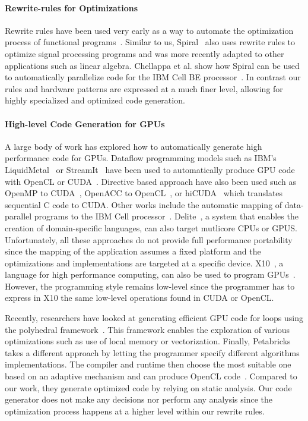\paragraph{Rewrite-rules for Optimizations}
Rewrite rules have been used very early as a way to automate the optimization process of functional programs~\cite{jones01playing}.
Similar to us, Spiral~\cite{pueschel05spiral,Spampinato13LGen} also uses rewrite rules to optimize signal processing programs and was more recently adapted to other applications such as linear algebra.
Chellappa et al. show how Spiral can be used to automatically parallelize code for the IBM Cell BE processor~\cite{Chellappa09computer}.
In contrast our rules and hardware patterns are expressed at a much finer level, allowing for highly specialized and optimized code generation.

\paragraph{High-level Code Generation for GPUs} 
A large body of work has explored how to automatically generate high performance code for GPUs.
Dataflow programming models such as IBM's LiquidMetal~\cite{dubach12compiling} or StreamIt~\cite{thies02streamit} have been used to automatically produce GPU code with OpenCL or CUDA~\cite{hormati11sponge,huynh12scalable,udupa09software}.
Directive based approach have also been used such as OpenMP to CUDA~\cite{lee09openmp}, OpenACC to OpenCL~\cite{reyes12openaccgpu}, or hiCUDA~\cite{han11hicuda} which translates sequential C code to CUDA.
Other works include the automatic mapping of data-parallel programs to the IBM Cell processor~\cite{Wang09automatic}.
Delite~\cite{brown11heterogeneous,chafi11domain}, a system that enables the creation of domain-specific languages, can also target mutlicore CPUs or GPUS.
Unfortunately, all these approaches do not provide full performance portability since the mapping of the application assumes a fixed platform and the optimizations and implementations are targeted at a specific device.
X10~\cite{charles05x10}, a language for high performance computing, can also be used to program GPUs~\cite{cunningham11gpu}.
However, the programming style remains low-level since the programmer has to express in X10 the same low-level operations found in CUDA or OpenCL.

Recently, researchers have looked at generating efficient GPU code for loops using the polyhedral framework~\cite{verdoolaege13polyhedral}.
This framework enables the exploration of various optimizations such as use of local memory or vectorization.
Finally, Petabricks~\cite{ansel09petabricks} takes a different approach by letting the programmer specify different algorithms implementations.
The compiler and runtime then choose the most suitable one based on an adaptive mechanism and can produce OpenCL code~\cite{phothilimthana13portable}.
Compared to our work, they generate optimized code by relying on static analysis.
Our code generator does not make any decisions nor perform any analysis since the optimization process happens at a higher level within our rewrite rules.

